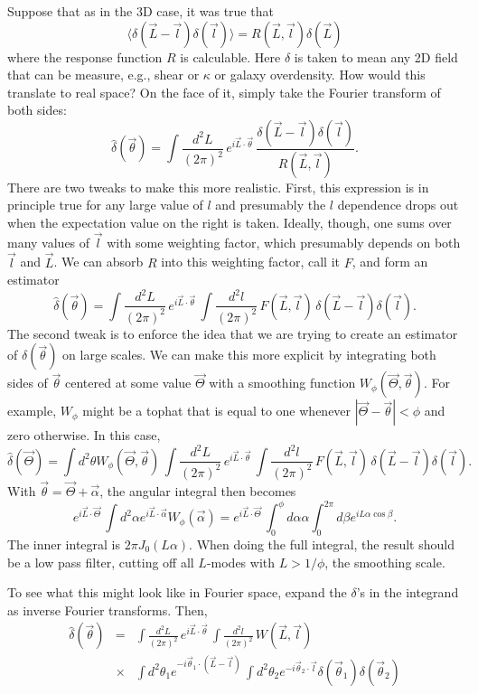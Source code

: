 \documentclass[prd,amsmath,amssymb,floatfix,superscriptaddress,nofootinbib]{revtex4-1}
\def\be{\begin{equation}}
\def\ee{\end{equation}}
\def\bea{\begin{eqnarray}}
\def\eea{\end{eqnarray}}
\newcommand{\vs}{\nonumber\\}
\begin{document}
Suppose that as in the 3D case, it was true that 
\be
\langle \delta(\vec L-\vec l)\delta(\vec l)\rangle  = R(\vec L,\vec l) \delta (\vec L)\ee
where the response function $R$ is calculable. Here $\delta$ is taken to mean any 2D field that can be measure, e.g., shear or $\kappa$ or galaxy overdensity. 
How would this translate to real space? On the face of it, simply take the Fourier transform of both sides:
\be
\hat \delta(\vec\theta) = \int \frac{d^2L}{(2\pi)^2}\, e^{i\vec L\cdot\vec\theta} \, \frac{\delta(\vec L-\vec l)\delta(\vec l)}{R(\vec L,\vec l) }
.\ee
There are two tweaks to make this more realistic. First, this expression is in principle true for any large value of $l$ and presumably the $l$ dependence drops out when the expectation value on the right is taken. Ideally, though, one sums over many values of $\vec l$ with some weighting factor, which presumably depends on both $\vec l$ and $\vec L$. We can absorb $R$ into this weighting factor, call it $F$, and form an estimator
\be
\hat \delta(\vec\theta) = \int \frac{d^2L}{(2\pi)^2}\, e^{i\vec L\cdot\vec\theta} \, \int \frac{d^2l}{(2\pi)^2}\, F(\vec L,\vec l)\, \delta(\vec L-\vec l)\delta(\vec l)
.\ee
The second tweak is to enforce the idea that we are trying to create an estimator of $\delta(\vec\theta)$ on large scales. We can make this more explicit by integrating both sides of $\vec\theta$ centered at some value $\vec\Theta$ with a smoothing function $W_\phi(\vec\Theta,\vec\theta)$. For example, $W_\phi$ might be a tophat that is equal to one whenever $|\vec\Theta-\vec\theta|<\phi$ and zero otherwise. In this case,
\be
\hat \delta(\vec\Theta) = \int d^2\theta W_\phi(\vec\Theta,\vec\theta)\, \int \frac{d^2L}{(2\pi)^2}\, e^{i\vec L\cdot\vec\theta} \, \int \frac{d^2l}{(2\pi)^2}\, F(\vec L,\vec l)\, \delta(\vec L-\vec l)\delta(\vec l)
.\ee
With $\vec\theta=\vec\Theta+\vec\alpha$, the angular integral then becomes
\be
e^{i\vec L\cdot\vec\Theta}\, \int d^2\alpha e^{i\vec L\cdot\vec\alpha} W_\phi(\vec\alpha)
= e^{i\vec L\cdot\vec\Theta}\, \int_0^\phi d\alpha \alpha \int_0^{2\pi} d\beta e^{iL\alpha\cos\beta}.\ee
The inner integral is $2\pi J_0(L\alpha)$. When doing the full integral, the result should be a low pass filter, cutting off all $L$-modes with $L>1/\phi$, the smoothing scale.


To see what this might look like in Fourier space, expand the $\delta$'s in the integrand as inverse Fourier transforms. Then,
\bea
\hat \delta(\vec\theta) &=& \int \frac{d^2L}{(2\pi)^2}\, e^{i\vec L\cdot\vec\theta} \, \int \frac{d^2l}{(2\pi)^2}\, W(\vec L, \vec l)
\vs
&\times&\int d^2\theta_1 e^{-i\vec\theta_1\cdot(\vec L - \vec l)} \,
\int d^2\theta_2 e^{-i\vec\theta_2\cdot\vec l} \delta(\vec\theta_1)\delta(\vec\theta_2)
\eea
\end{document}

